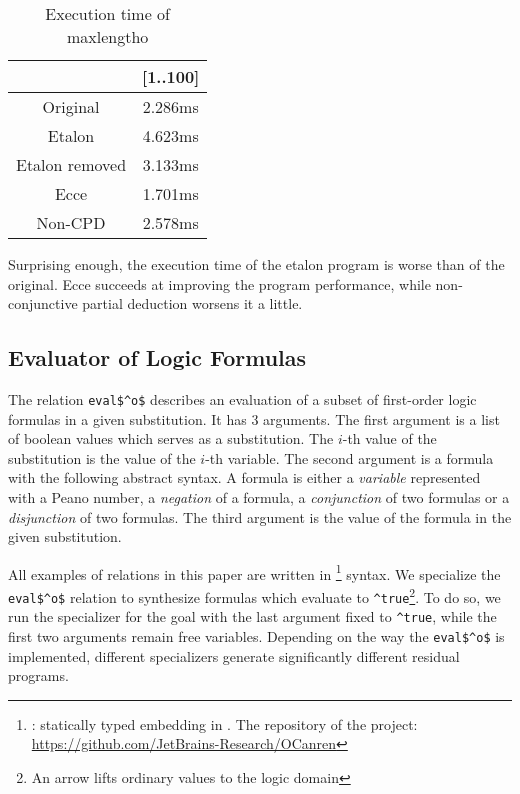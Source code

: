 \begin{table}
  \centering
  \begin{tabular}{c||c}
                   & [1..100] \\ \hline\hline
  Original         & 2.286ms  \\ \hline
  Etalon           & 4.623ms  \\ \hline
  Etalon removed   & 3.133ms  \\ \hline
  Ecce             & 1.701ms  \\ \hline
  Non-CPD          & 2.578ms
  \end{tabular}

  \caption{Execution time of maxlengtho}
  \label{tbl:maxlen}
\end{table}

Surprising enough, the execution time of the etalon program is worse than of the original.
Ecce succeeds at improving the program performance, while non-conjunctive partial deduction worsens it a little.

\subsection{Evaluator of Logic Formulas}

The relation \lstinline{eval$^o$} describes an evaluation of a subset of first-order logic formulas in a given substitution.
It has 3 arguments.
The first argument is a list of boolean values which serves as a substitution.
The $i$-th value of the substitution is the value of the $i$-th variable.
The second argument is a formula with the following abstract syntax.
A formula is either a \emph{variable} represented with a Peano number, a \emph{negation} of a formula, a \emph{conjunction} of two formulas or a \emph{disjunction} of two formulas.
The third argument is the value of the formula in the given substitution.

All examples of \mk{} relations in this paper are written in \oc{}\footnote{\oc{}: statically typed \mk{} embedding in \ocaml{}. The repository of the project: \url{https://github.com/JetBrains-Research/OCanren}} syntax.
We specialize the \lstinline{eval$^o$} relation to synthesize formulas which evaluate to \lstinline{^true}\footnote{An arrow lifts ordinary values to the logic domain}.
To do so, we run the specializer for the goal with the last argument fixed to \lstinline{^true}, while the first two arguments remain free variables.
Depending on the way the \lstinline{eval$^o$} is implemented, different specializers generate significantly different residual programs.

